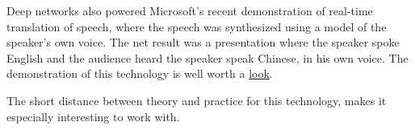 \documentclass[11pt]{article}
\begin{document}
Deep networks also powered Microsoft's recent demonstration of real-time translation of speech, where the speech was synthesized using a model of the speaker's own voice.  The net result was a presentation where the speaker spoke English and the audience heard the speaker speak Chinese, in his own voice.  The demonstration of this technology is well worth a \href{http://www.youtube.com/watch?v=Nu-nlQqFCKg}{look}.

The short distance between theory and practice for this technology, makes it especially interesting to work with.



\end{document}
